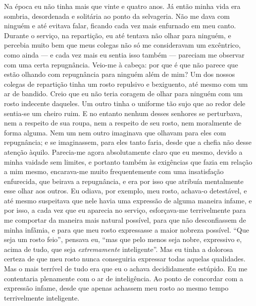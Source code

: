 Na época eu não tinha mais que vinte e quatro anos. Já então minha vida
era sombria, desordenada e solitária ao ponto da selvageria. Não me
dava com ninguém e até evitava falar, ficando cada vez mais enfurnado
em meu canto. Durante o serviço, na repartição, eu até tentava não
olhar para ninguém, e percebia muito bem que meus colegas não só me
consideravam um excêntrico, como ainda --- e cada vez mais eu sentia isso
também --- pareciam me observar com uma certa repugnância. Veio-me à
cabeça: por que é que não parece que estão olhando com repugnância para
ninguém além de mim? Um dos nossos colegas de repartição tinha um rosto
repulsivo e bexiguento, até mesmo com um ar de bandido. Creio que eu
não teria coragem de olhar para ninguém com um rosto indecente
daqueles. Um outro tinha o uniforme tão sujo que ao redor dele
sentia-se um cheiro ruim. E no entanto nenhum desses senhores se
perturbava, nem a respeito de sua roupa, nem a respeito de seu rosto,
nem moralmente de forma alguma. Nem um nem outro imaginava que olhavam
para eles com repugnância; e se imaginassem, para eles tanto faria,
desde que a chefia não desse atenção àquilo. Parecia-me agora
absolutamente claro que eu mesmo, devido a minha vaidade sem limites, e
portanto também às exigências que fazia em relação a mim mesmo,
encarava-me muito frequentemente com uma insatisfação enfurecida, que
beirava a repugnância, e era por isso que atribuía mentalmente esse
olhar aos outros. Eu odiava, por exemplo, meu rosto, achava-o
detestável, e até mesmo suspeitava que nele havia uma expressão de
alguma maneira infame, e por isso, a cada vez que eu aparecia no
serviço, esforçava-me terrivelmente para me comportar da maneira mais
natural possível, para que não desconfiassem de minha infâmia, e para
que meu rosto expressasse a maior nobreza possível. “Que seja um rosto
feio”, pensava eu, “mas que pelo menos seja nobre, expressivo e, acima
de tudo, que seja \textit{extremamente} inteligente”. Mas eu tinha a
dolorosa certeza de que meu rosto nunca conseguiria expressar todas
aquelas qualidades. Mas o mais terrível de tudo era que eu o achava
decididamente estúpido. Eu me contentaria plenamente com o ar de
inteligência. Ao ponto de concordar com a expressão infame, desde que
apenas achassem meu rosto ao mesmo tempo terrivelmente inteligente.

